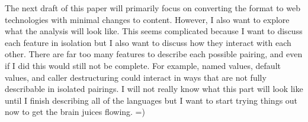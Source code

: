 The next draft of this paper will primarily focus on converting the format to web
technologies with minimal changes to content.
However, I also want to explore what the analysis will look like.
This seems complicated because I want to discuss each feature in isolation but I also want
to discuss how they interact with each other.
There are far too many features to describe each possible pairing, and even if I did this
would still not be complete.
For example, named values, default values, and caller destructuring could interact in ways
that are not fully describable in isolated pairings.
I will not really know what this part will look like until I finish describing all of the
languages but I want to start trying things out now to get the brain juices flowing. =)
